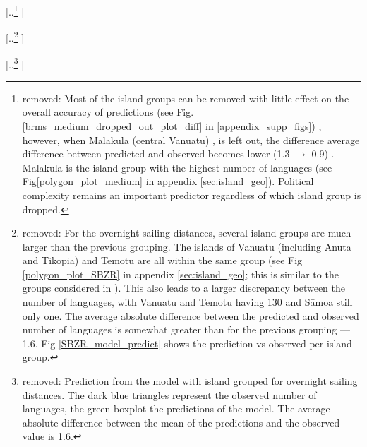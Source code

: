 \documentclass[unnumsec,webpdf,modern,medium]{oup-authoring-template}
\providecommand{\DIFdeltex}[1]{{\protect\color{red} [..\footnote{removed: #1} ]}} %
\providecommand{\DIFdelFL}[1]{\DIFdel{#1}} %
\providecommand{\DIFdel}[1]{\texorpdfstring{\DIFdeltex{#1}}{}} %
\begin{document}

\DIFdel{Most of the island groups can be removed with little effect on the overall accuracy of predictions (see Fig. \ref{brms_medium_dropped_out_plot_diff} in \ref{appendix_supp_figs}) , however, when Malakula (central Vanuatu) , is left out, the difference average difference between predicted and observed becomes lower (1.3 $\rightarrow$ 0.9) . Malakula is the island group with the highest number of languages (see Fig\ref{polygon_plot_medium} in appendix \ref{sec:island_geo}). Political complexity remains an important predictor regardless of which island group is dropped.
}%


\DIFdel{For the overnight sailing distances, several island groups are much larger than the previous grouping. The islands of Vanuatu  (including Anuta and Tikopia) and Temotu are all within the same group (see Fig \ref{polygon_plot_SBZR} in appendix \ref{sec:island_geo}; this is similar to the groups considered in \citet{pawley2007}). This also leads to a larger discrepancy between the number of languages, with Vanuatu and Temotu having 130 and S\={a}moa still only one. The average absolute difference between the predicted and observed number of languages is somewhat greater than for the previous grouping --- 1.6. Fig \ref{SBZR_model_predict} shows the prediction vs observed per island group. }%

{%
\DIFdelFL{Prediction from the model with island grouped for overnight sailing distances. The dark blue triangles represent the observed number of languages, the green boxplot the predictions of the model. The average absolute difference between the mean of the predictions and the observed value is 1.6.}}
\end{document}
